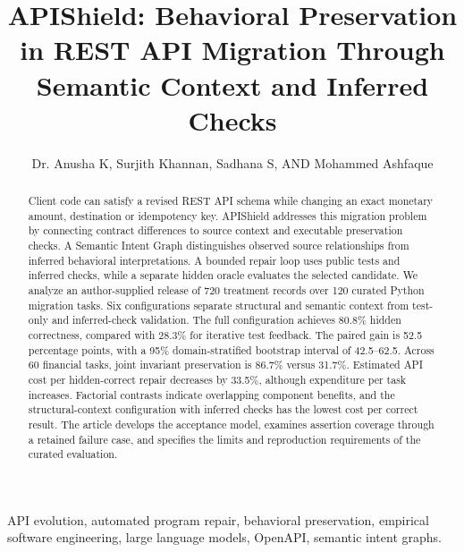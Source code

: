 \documentclass[nolineno]{ieeeaccess}
\begin{document}
\doi{}
\title{APIShield: Behavioral Preservation in REST API Migration Through Semantic Context and Inferred Checks}
\author{Dr. Anusha K, Surjith Khannan, Sadhana S, AND Mohammed Ashfaque}
\begin{abstract}
Client code can satisfy a revised REST API schema while changing an exact monetary amount, destination or idempotency key. APIShield addresses this migration problem by connecting contract differences to source context and executable preservation checks. A Semantic Intent Graph distinguishes observed source relationships from inferred behavioral interpretations. A bounded repair loop uses public tests and inferred checks, while a separate hidden oracle evaluates the selected candidate. We analyze an author-supplied release of 720 treatment records over 120 curated Python migration tasks. Six configurations separate structural and semantic context from test-only and inferred-check validation. The full configuration achieves 80.8\% hidden correctness, compared with 28.3\% for iterative test feedback. The paired gain is 52.5 percentage points, with a 95\% domain-stratified bootstrap interval of 42.5--62.5. Across 60 financial tasks, joint invariant preservation is 86.7\% versus 31.7\%. Estimated API cost per hidden-correct repair decreases by 33.5\%, although expenditure per task increases. Factorial contrasts indicate overlapping component benefits, and the structural-context configuration with inferred checks has the lowest cost per correct result. The article develops the acceptance model, examines assertion coverage through a retained failure case, and specifies the limits and reproduction requirements of the curated evaluation.
\end{abstract}
\begin{keywords}
API evolution, automated program repair, behavioral preservation, empirical software engineering, large language models, OpenAPI, semantic intent graphs.
\end{keywords}
\titlepgskip=-15pt
\newlength{\savedparagraphindent}\setlength{\savedparagraphindent}{\parindent}
\setlength{\parindent}{0pt}\maketitle\setlength{\parindent}{\savedparagraphindent}



\EOD
\end{document}
